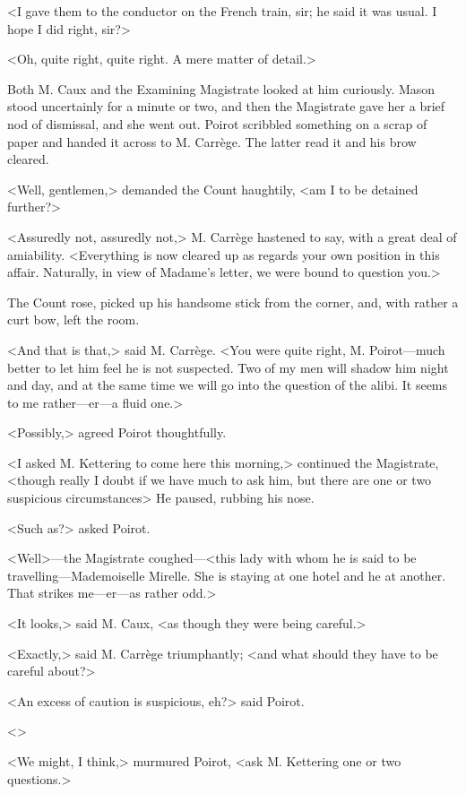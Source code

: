<I gave them to the conductor on the French train, sir; he said it was usual. I hope I did right, sir?>

<Oh, quite right, quite right. A mere matter of detail.>

Both M. Caux and the Examining Magistrate looked at him curiously. Mason stood uncertainly for a minute or two, and then the Magistrate gave her a brief nod of dismissal, and she went out. Poirot scribbled something on a scrap of paper and handed it across to M. Carrège. The latter read it and his brow cleared.

<Well, gentlemen,> demanded the Count haughtily, <am I to be detained further?>

<Assuredly not, assuredly not,> M. Carrège hastened to say, with a great deal of amiability. <Everything is now cleared up as regards your own position in this affair. Naturally, in view of Madame's letter, we were bound to question you.>

The Count rose, picked up his handsome stick from the corner, and, with rather a curt bow, left the room.

<And that is that,> said M. Carrège. <You were quite right, M. Poirot—much better to let him feel he is not suspected. Two of my men will shadow him night and day, and at the same time we will go into the question of the alibi. It seems to me rather—er—a fluid one.>

<Possibly,> agreed Poirot thoughtfully.

<I asked M. Kettering to come here this morning,> continued the Magistrate, <though really I doubt if we have much to ask him, but there are one or two suspicious circumstances\longdash> He paused, rubbing his nose.

<Such as?> asked Poirot.

<Well>—the Magistrate coughed—<this lady with whom he is said to be travelling—Mademoiselle Mirelle. She is staying at one hotel and he at another. That strikes me—er—as rather odd.>

<It looks,> said M. Caux, <as though they were being careful.>

<Exactly,> said M. Carrège triumphantly; <and what should they have to be careful about?>

<An excess of caution is suspicious, eh?> said Poirot.

<>

<We might, I think,> murmured Poirot, <ask M. Kettering one or two questions.>

